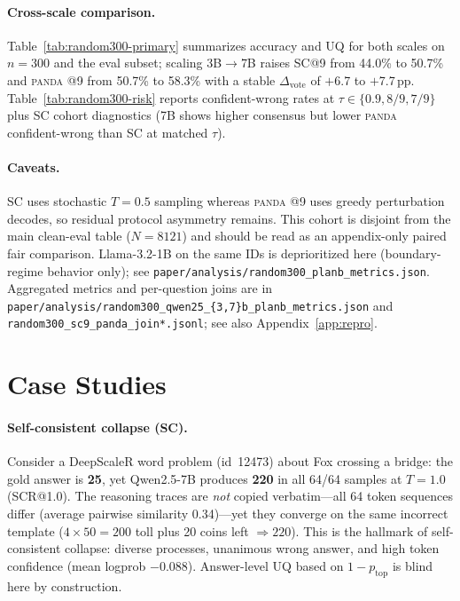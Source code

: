 \documentclass{article} %
\DeclareRobustCommand{\method}{%
  \texorpdfstring{%
    \ifmmode\text{\normalfont\textsc{panda}}\else\textsc{panda}\xspace\fi
  }{PANDA}%
}
\begin{document}
\paragraph{Cross-scale comparison.}
Table~\ref{tab:random300-primary} summarizes accuracy and UQ for both scales on $n{=}300$ and the eval subset; scaling 3B$\to$7B raises SC@9 from 44.0\% to 50.7\% and \method{}@9 from 50.7\% to 58.3\% with a stable $\Delta_{\mathrm{vote}}$ of $+$6.7 to $+$7.7\,pp.
Table~\ref{tab:random300-risk} reports confident-wrong rates at $\tau\in\{0.9,8/9,7/9\}$ plus SC cohort diagnostics (7B shows higher consensus but lower \method{} confident-wrong than SC at matched $\tau$).

\paragraph{Caveats.}
SC uses stochastic $T{=}0.5$ sampling whereas \method{}@9 uses greedy perturbation decodes, so residual protocol asymmetry remains.
This cohort is disjoint from the main clean-eval table ($N{=}8121$) and should be read as an appendix-only paired fair comparison.
Llama-3.2-1B on the same IDs is deprioritized here (boundary-regime behavior only); see \texttt{paper/analysis/random300\_planb\_metrics.json}.
Aggregated metrics and per-question joins are in \texttt{paper/analysis/random300\_qwen25\_\{3,7\}b\_planb\_metrics.json} and \texttt{random300\_sc9\_panda\_join*.jsonl}; see also Appendix~\ref{app:repro}.


\section{Case Studies}
\label{app:cases}

\paragraph{Self-consistent collapse (SC).}
Consider a DeepScaleR word problem (id~12473) about Fox crossing a bridge: the gold answer is \textbf{25}, yet Qwen2.5-7B produces \textbf{220} in all 64/64 samples at $T{=}1.0$ (SCR@1.0).
The reasoning traces are \emph{not} copied verbatim---all 64 token sequences differ (average pairwise similarity 0.34)---yet they converge on the same incorrect template ($4\times50=200$ toll plus 20 coins left $\Rightarrow\boxed{220}$).
This is the hallmark of self-consistent collapse: diverse processes, unanimous wrong answer, and high token confidence (mean logprob $-0.088$).
Answer-level UQ based on $1-p_{\mathrm{top}}$ is blind here by construction.
\end{document}
